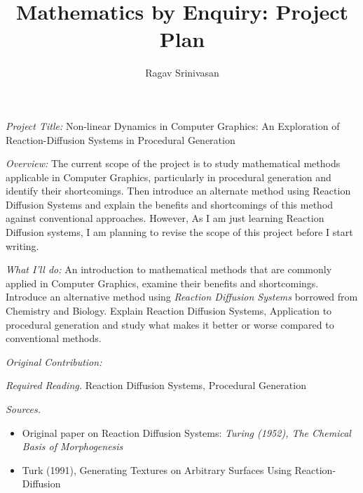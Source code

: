 \documentclass[a4paper, 11pt]{article}
\begin{document}
\title{Mathematics by Enquiry: Project Plan}
\author{Ragav Srinivasan}
\maketitle{}

\textit{Project Title:} Non-linear Dynamics in Computer Graphics: An Exploration of Reaction-Diffusion Systems in Procedural Generation


\textit{Overview:} The current scope of the project is to study mathematical methods applicable in Computer Graphics, particularly in procedural generation and identify their shortcomings. Then introduce an alternate method using Reaction Diffusion Systems and explain the benefits and shortcomings of this method against conventional approaches. However, As I am just learning Reaction Diffusion systems, I am planning to revise the scope of this project before I start writing.

\textit{What I'll do:} An introduction to mathematical methods that are commonly applied in Computer Graphics, examine their benefits and shortcomings. Introduce an alternative method using \textit{Reaction Diffusion Systems} borrowed from Chemistry and Biology. Explain Reaction Diffusion Systems, Application to procedural generation and study what makes it better or worse compared to conventional methods.

\textit{Original Contribution:}

\textit{Required Reading.} Reaction Diffusion Systems, Procedural Generation

\textit{Sources.}

\begin{itemize}
	\item  Original paper on Reaction Diffusion Systems: \textit{Turing (1952), The Chemical Basis of Morphogenesis}
	\item Turk (1991), Generating Textures on Arbitrary Surfaces Using Reaction-Diffusion
\end{itemize}
\end{document}
